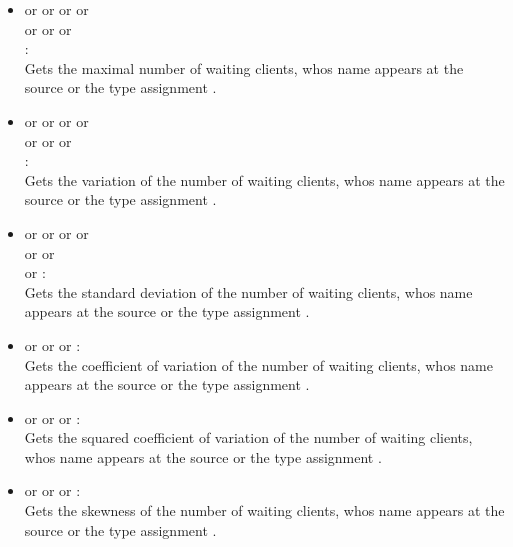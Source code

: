 \begin{itemize}
\item
{} or  or  or  or\\
 or  or  or\\
:\\
Gets the maximal number of waiting clients, whos name appears at the source or the type assignment .

\item
{} or  or  or  or\\
 or  or  or\\
:\\
Gets the variation of the number of waiting clients, whos name appears at the source or the type assignment .

\item
{} or  or  or  or\\
 or  or\\
 or :\\
Gets the standard deviation of the number of waiting clients, whos name appears at the source or the type assignment .

\item
{} or  or  or :\\
Gets the coefficient of variation of the number of waiting clients, whos name appears at the source or the type assignment .

\item
{} or  or  or :\\
Gets the squared coefficient of variation of the number of waiting clients, whos name appears at the source or the type assignment .

\item
{} or  or  or :\\
Gets the skewness of the number of waiting clients, whos name appears at the source or the type assignment .


\end{itemize}
